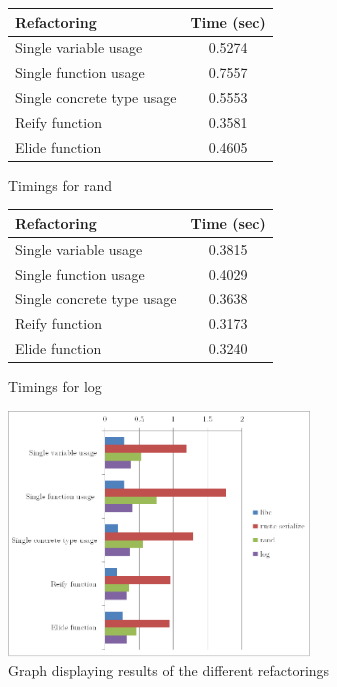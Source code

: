 \begin{figure}
\centering
\begin{minipage}{.5\textwidth}
  \begin{center}
    \begin{tabular}{ | l | c |}
    \hline
    \textbf{Refactoring} & \textbf{Time (sec)} \\ \hline
    Single variable usage &  0.5274 \\ \hline
    Single function usage &  0.7557 \\ \hline
    Single concrete type usage  & 0.5553 \\ \hline
    Reify function &   0.3581 \\ \hline
    Elide function & 0.4605 \\ \hline
    \end{tabular}
\end{center}

\caption{Timings for rand}
\label{Fig:rand}
\end{minipage}%
\begin{minipage}{.5\textwidth}
\begin{center}
    \begin{tabular}{ | l | c |}
    \hline
    \textbf{Refactoring} & \textbf{Time (sec)} \\ \hline
    Single variable usage &  0.3815  \\ \hline
    Single function usage &   0.4029  \\ \hline
    Single concrete type usage  &  0.3638 \\ \hline
    Reify function &   0.3173 \\ \hline
    Elide function &  0.3240 \\ \hline
    \end{tabular}
\end{center}

\caption{Timings for log}
\label{Fig:log}
\end{minipage}
\end{figure}

\begin{figure}[h]
\begin{center}

\includegraphics[width=8cm]{refactorings}

\caption{Graph displaying results of the different refactorings}
\label{Fig:compareref}
\end{center}
\end{figure}

